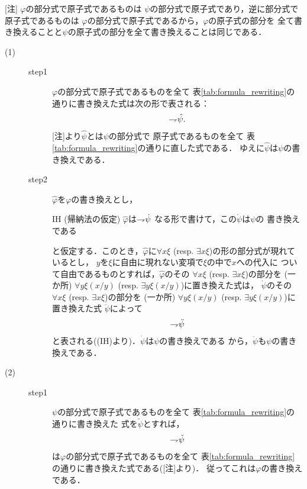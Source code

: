 	\begin{metaprf}\mbox{}
		[注] $\varphi$の部分式で原子式であるものは
		$\psi$の部分式で原子式であり，逆に部分式で原子式であるものは
		$\varphi$の部分式で原子式であるから，$\varphi$の原子式の部分を
		全て書き換えることと$\psi$の原子式の部分を全て書き換えることは同じである．
		\begin{description}
			\item[(1)] 
				\begin{description}
					\item[step1]
						$\varphi$の部分式で原子式であるものを全て
						表\ref{tab:formula_rewriting}の通りに書き換えた式は次の形で表される：
						\begin{align}
							\rightharpoondown\hspace{-0.25em} \hat{\psi}.
						\end{align}
						[注]より$\hat{\psi}$とは$\psi$の部分式で
						原子式であるものを全て
						表\ref{tab:formula_rewriting}の通りに直した式である．
						ゆえに$\hat{\psi}$は$\psi$の書き換えである．
						
					\item[step2]
						$\widehat{\varphi}$を$\varphi$の書き換えとし，
						\begin{itembox}[l]{IH (帰納法の仮定)}
							$\widehat{\varphi}$は$\rightharpoondown\hspace{-0.25em} \dot{\psi}$
							なる形で書けて，この$\dot{\psi}$は$\psi$の
							書き換えである
						\end{itembox}
						と仮定する．このとき，$\widehat{\varphi}$に$\forall x \xi$ 
						(resp. $\exists x \xi$)の形の部分式が現れているとし，
						$y$を$\xi$に自由に現れない変項で$\xi$の中で$x$への代入に
						ついて自由であるものとすれば，$\widehat{\varphi}$のその
						$\forall x \xi$ (resp. $\exists x \xi$)の部分を
						(一か所) $\forall y \xi(x/y)$
						(resp. $\exists y \xi(x/y)$)に置き換えた式は，
						$\dot{\psi}$のその$\forall x \xi$
						(resp. $\exists x \xi$)の部分を
						(一か所) $\forall y \xi(x/y)$
						(resp. $\exists y \xi(x/y)$)に置き換えた式
						$\ddot{\psi}$によって
						\begin{align}
							\rightharpoondown\hspace{-0.25em} \ddot{\psi}
						\end{align}
						と表される((IH)より)．$\dot{\psi}$は$\psi$の書き換えである
						から，$\ddot{\psi}$も$\psi$の書き換えである．
				\end{description}
				
			\item[(2)]		
				\begin{description}
					\item[step1]
						$\psi$の部分式で原子式であるものを全て
						表\ref{tab:formula_rewriting}の通りに書き換えた
						式を$\check{\psi}$とすれば，
						\begin{align}
							\rightharpoondown\hspace{-0.25em} \check{\psi}
						\end{align}
						は$\varphi$の部分式で原子式であるものを全て
						表\ref{tab:formula_rewriting}の通りに書き換えた式である([注]より)．
						従ってこれは$\varphi$の書き換えである．
								

\end{description}
\end{description}
\end{metaprf}

